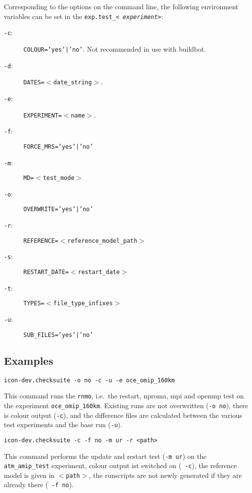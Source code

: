 Corresponding to the options on the command line, the following
environment variables can be set in the {\tt exp.test\_<{\it
    experiment}>}:

\begin{description}
\item[{\tt -c}:] {\tt COLOUR='yes'|'no'}. Not recommended in use with buildbot.
\item[{\tt -d}:] {\tt DATES=$<$date\_string$>$}. 
\item[{\tt -e}:] {\tt EXPERIMENT=$<$name$>$}.
\item[{\tt -f}:] {\tt FORCE\_MRS='yes'|'no'} 
\item[{\tt -m}:] {\tt MD=$<$test\_mode$>$}
\item[{\tt -o}:] {\tt OVERWRITE='yes'|'no'}
\item[{\tt -r}:] {\tt REFERENCE=$<$reference\_model\_path$>$}
\item[{\tt -s}:] {\tt RESTART\_DATE=$<$restart\_date$>$}
\item[{\tt -t}:] {\tt TYPES=$<$file\_type\_infixes$>$}
\item[{\tt -u}:] {\tt SUB\_FILES='yes'|'no'}
\end{description}

\subsection{Examples}

\begin{Verbatim}[frame=single]
icon-dev.checksuite -o no -c -u -e oce_omip_160km
\end{Verbatim}

This command runs the {\tt rnmo}, i.e.~the restart, nproma, mpi and
openmp test on the experiment {\tt oce\_omip\_160km}. Existing runs
are not overwritten ({\tt -o no}), there is colour output ({\tt -c}),
and the difference files are calculated between the various test
experiments and the base run ({\tt -u}).

\begin{Verbatim}[frame=single]
icon-dev.checksuite -c -f no -m ur -r <path>
\end{Verbatim}

This command performs the update and restart test ({\tt -m ur}) on the {\tt
  atm\_amip\_test} experiment, colour output ist switched on ({\tt
  -c}), the reference model is given in {\tt $<$path$>$}, the
runscripts are not newly generated if they are already there ({\tt
  -f no}).

